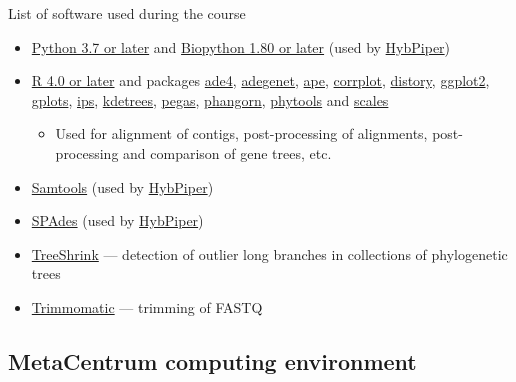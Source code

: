 \documentclass[compress, ucs, xelatex, 11pt, xcolor=x11names, aspectratio=169,
	hyperref={
		bookmarks=true,
		unicode=true,
		colorlinks=true,
		pdftitle={HybSeq course},
		plainpages=false,
		pdfauthor={Vojtech Zeisek},
		pdfsubject={Practical processing of HybSeq target enrichment sequencing data on computing grids like MetaCentrum},
		pdfcreator={XeLaTeX},
		pdfkeywords={BASH, command line, GNU, HybSeq, Linux, MetaCentrum, sequencing shell, target enrichment},
		linkcolor=Turquoise4, %
		anchorcolor=DodgerBlue4, %
		citecolor=DodgerBlue4, %
		filecolor=DodgerBlue4, %
		menucolor=Tan4, %
		urlcolor=DarkOliveGreen4, %
		pdftex},
	url={hyphens, lowtilde} %
	]{beamer}
\begin{document}
\begin{frame}[allowframebreaks]{List of software used during the course}
\begin{itemize}
		\item \href{https://www.python.org/}{Python 3.7 or later} and \href{https://biopython.org/}{Biopython 1.80 or later} (used by \href{https://github.com/mossmatters/HybPiper/wiki}{HybPiper})
		\item \href{https://www.r-project.org/}{R 4.0 or later} and packages \href{https://cran.r-project.org/package=ade4}{ade4}, \href{https://cran.r-project.org/package=adegenet}{adegenet}, \href{https://cran.r-project.org/package=ape}{ape}, \href{https://cran.r-project.org/package=corrplot}{corrplot}, \href{https://cran.r-project.org/package=distory}{distory}, \href{https://cran.r-project.org/package=ggplot2}{ggplot2}, \href{https://cran.r-project.org/package=gplots}{gplots}, \href{https://cran.r-project.org/package=ips}{ips}, \href{https://cran.r-project.org/package=kdetrees}{kdetrees}, \href{https://cran.r-project.org/package=pegas}{pegas}, \href{https://cran.r-project.org/package=phangorn}{phangorn}, \href{https://cran.r-project.org/package=phytools}{phytools} and \href{https://cran.r-project.org/package=scales}{scales}
		\begin{itemize}
			\item Used for alignment of contigs, post-processing of alignments, post-processing and comparison of gene trees, etc.
		\end{itemize}
		\item \href{https://www.htslib.org/}{Samtools} (used by \href{https://github.com/mossmatters/HybPiper/wiki}{HybPiper})
		\item \href{https://github.com/ablab/spades}{SPAdes} (used by \href{https://github.com/mossmatters/HybPiper/wiki}{HybPiper})
		\item \href{https://github.com/uym2/TreeShrink}{TreeShrink} --- detection of outlier long branches in collections of phylogenetic trees
		\item \href{http://www.usadellab.org/cms/?page=trimmomatic}{Trimmomatic} --- trimming of FASTQ
	\end{itemize}
\end{frame}

\subsection{MetaCentrum computing environment}
\end{document}
